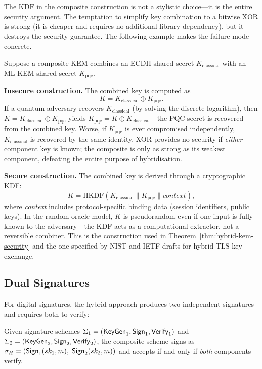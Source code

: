 The $\mathrm{KDF}$ in the composite construction is not a stylistic choice---it is the entire security argument.  The temptation to simplify key combination to a bitwise XOR is strong (it is cheaper and requires no additional library dependency), but it destroys the security guarantee.  The following example makes the failure mode concrete.

\begin{example}
\label{ex:hybrid-key-derivation}
Suppose a composite KEM combines an ECDH shared secret $K_{\text{classical}}$ with an ML-KEM shared secret $K_{\text{pqc}}$.

\textbf{Insecure construction.}  The combined key is computed as
\[
K = K_{\text{classical}} \oplus K_{\text{pqc}}.
\]
If a quantum adversary recovers $K_{\text{classical}}$ (by solving the discrete logarithm), then $K = K_{\text{classical}} \oplus K_{\text{pqc}}$ yields $K_{\text{pqc}} = K \oplus K_{\text{classical}}$---the PQC secret is recovered from the combined key.  Worse, if $K_{\text{pqc}}$ is ever compromised independently, $K_{\text{classical}}$ is recovered by the same identity.  XOR provides no security if \emph{either} component key is known; the composite is only as strong as its weakest component, defeating the entire purpose of hybridisation.

\textbf{Secure construction.}  The combined key is derived through a cryptographic KDF:
\[
K = \mathrm{HKDF}(K_{\text{classical}} \| K_{\text{pqc}} \| \mathit{context}),
\]
where \emph{context} includes protocol-specific binding data (session identifiers, public keys).  In the random-oracle model, $K$ is pseudorandom even if one input is fully known to the adversary---the KDF acts as a computational extractor, not a reversible combiner.  This is the construction used in Theorem~\ref{thm:hybrid-kem-security} and the one specified by NIST and IETF drafts for hybrid TLS key exchange.
\end{example}


\subsection{Dual Signatures}
\label{subsec:dual-signatures}

For digital signatures, the hybrid approach produces two independent signatures and requires both to verify:

\begin{definition}
\label{def:composite-sig}
Given signature schemes $\Sigma_1 = (\mathsf{KeyGen}_1, \mathsf{Sign}_1, \mathsf{Verify}_1)$ and $\Sigma_2 = (\mathsf{KeyGen}_2, \mathsf{Sign}_2, \mathsf{Verify}_2)$, the composite scheme signs as $\sigma_H = (\mathsf{Sign}_1(sk_1, m),\; \mathsf{Sign}_2(sk_2, m))$ and accepts if and only if \emph{both} components verify.
\end{definition}

